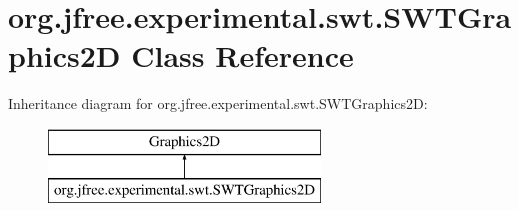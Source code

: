 \hypertarget{classorg_1_1jfree_1_1experimental_1_1swt_1_1_s_w_t_graphics2_d}{}\section{org.\+jfree.\+experimental.\+swt.\+S\+W\+T\+Graphics2D Class Reference}
\label{classorg_1_1jfree_1_1experimental_1_1swt_1_1_s_w_t_graphics2_d}
Inheritance diagram for org.\+jfree.\+experimental.\+swt.\+S\+W\+T\+Graphics2D\+:\begin{figure}[H]
\begin{center}
\leavevmode
\includegraphics[height=2.000000cm]{classorg_1_1jfree_1_1experimental_1_1swt_1_1_s_w_t_graphics2_d}
\end{center}
\end{figure}

